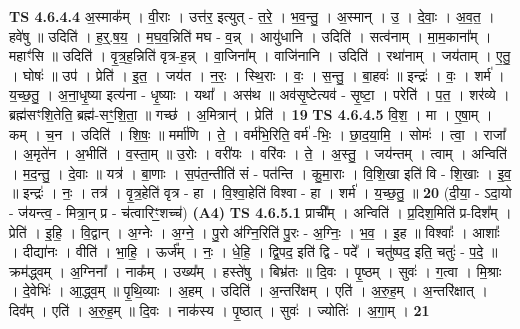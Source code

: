 \documentclass[17pt]{extarticle}
\begin{document}
                  \newline
                                \textbf{ TS 4.6.4.4} \newline
                  अ॒स्माक᳚म् । वी॒राः । उत्त॑र॒ इत्युत् - त॒रे॒ । भ॒व॒न्तु॒ । अ॒स्मान् । उ॒ । दे॒वाः॒ । अ॒व॒त॒ । हवे॑षु ॥ उदिति॑ । ह॒र्॒.ष॒य॒ । म॒घ॒व॒न्निति॑ मघ - व॒न्न् । आयु॑धानि । उदिति॑ । सत्व॑नाम् । मा॒म॒काना᳚म् । महाꣳ॑सि ॥ उदिति॑ । वृ॒त्र॒ह॒न्निति॑ वृत्र-ह॒न्न् । वा॒जिना᳚म् । वाजि॑नानि । उदिति॑ । रथा॑नाम् । जय॑ताम् । ए॒तु॒ । घोषः॑ ॥ उप॑ । प्रेति॑ । इ॒त॒ । जय॑त । न॒रः॒ । स्थि॒राः । वः॒ । स॒न्तु॒ । बा॒हवः॑ ॥ इन्द्रः॑ । वः॒ । शर्म॑ । य॒च्छ॒तु॒ । अ॒ना॒धृ॒ष्या इत्य॑ना - धृ॒ष्याः । यथा᳚ । अस॑थ ॥ अव॑सृ॒ष्टेत्यव॑ - सृ॒ष्टा॒ । परेति॑ । प॒त॒ । शर॑व्ये । ब्रह्म॑सꣳशि॒तेति॒ ब्रह्म॑-सꣳ॒॒शि॒ता॒ ॥ गच्छ॑ । अ॒मित्रान्॑ । प्रेति॑ । \textbf{  19} \newline
                  \newline
                                \textbf{ TS 4.6.4.5} \newline
                  वि॒श॒ । मा । ए॒षा॒म् । कम् । च॒न । उदिति॑ । शि॒षः॒ ॥ मर्मा॑णि । ते॒ । वर्म॑भि॒रिति॒ वर्म॑ -भिः॒ । छा॒द॒या॒मि॒ । सोमः॑ । त्वा॒ । राजा᳚ । अ॒मृते॑न । अ॒भीति॑ । व॒स्ता॒म् ॥ उ॒रोः । वरी॑यः । वरि॑वः । ते॒ । अ॒स्तु॒ । जय॑न्तम् । त्वाम् । अन्विति॑ । म॒द॒न्तु॒ । दे॒वाः ॥ यत्र॑ । बा॒णाः । स॒पंत॒न्तीति॑ सं - पत॑न्ति । कु॒मा॒राः । वि॒शि॒खा इति॑ वि - शि॒खाः । इ॒व॒ ॥ इन्द्रः॑ । नः॒ । तत्र॑ । वृ॒त्र॒हेति॑ वृत्र - हा । वि॒श्वा॒हेति॑ विश्वा - हा । शर्म॑ । य॒च्छ॒तु॒ ॥ \textbf{  20 } \newline
                  \newline
                      (दी॒या॒ - ऽदा॒यो - ज॑यन्त्व॒ - मित्रा॒न् प्र - च॑त्वारिꣳ॒॒शच्च॑)  \textbf{(A4)} \newline \newline
                                \textbf{ TS 4.6.5.1} \newline
                  प्राची᳚म् । अन्विति॑ । प्र॒दिश॒मिति॑ प्र-दिश᳚म् । प्रेति॑ । इ॒हि॒ । वि॒द्वान् । अ॒ग्नेः । अ॒ग्ने॒ । पु॒रो अ॑ग्नि॒रिति॑ पु॒रः - अ॒ग्निः॒ । भ॒व॒ । इ॒ह ॥ विश्वाः᳚ । आशाः᳚ । दीद्या॑नः । वीति॑ । भा॒हि॒ । ऊर्ज᳚म् । नः॒ । धे॒हि॒ । द्वि॒पद॒ इति॑ द्वि - पदे᳚ । चतु॑ष्पद॒ इति॒ चतुः॑ - प॒दे॒ ॥ क्रम॑द्ध्वम् । अ॒ग्निना᳚ । नाक᳚म् । उख्य᳚म् । हस्ते॑षु । बिभ्र॑तः ॥ दि॒वः । पृ॒ष्ठम् । सुवः॑ । ग॒त्वा । मि॒श्राः । दे॒वेभिः॑ । आ॒द्ध्व॒म् ॥ पृ॒थि॒व्याः । अ॒हम् । उदिति॑ । अ॒न्तरि॑क्षम् । एति॑ । अ॒रु॒ह॒म् । अ॒न्तरि॑क्षात् । दिव᳚म् । एति॑ । अ॒रु॒ह॒म् ॥ दि॒वः । नाक॑स्य । पृ॒ष्ठात् । सुवः॑ । ज्योतिः॑ । अ॒गा॒म् । \textbf{  21} \newline
\end{document}
